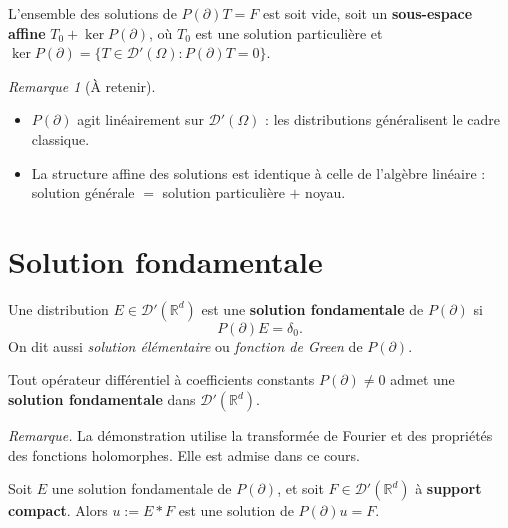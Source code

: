 \documentclass[12pt,a4paper,openany]{book}
\theoremstyle{definition}
\theoremstyle{plain}
\theoremstyle{remark}
\newtheorem*{remark}{Remarque}
\begin{document}
	\begin{proposition}
		L'ensemble des solutions de $P(\partial)T = F$ est soit vide, soit un
		\textbf{sous-espace affine} $T_0 + \ker P(\partial)$, où $T_0$ est une solution
		particulière et $\ker P(\partial) = \{T \in \mathcal{D}'(\Omega) : P(\partial)T = 0\}$.
	\end{proposition}
	
	\begin{remark}[À retenir]
		\begin{itemize}[itemsep=4pt]
			\item $P(\partial)$ agit linéairement sur $\mathcal{D}'(\Omega)$ : les distributions
			généralisent le cadre classique.
			\item La structure affine des solutions est identique à celle de l'algèbre linéaire :
			solution générale $=$ solution particulière $+$ noyau.
		\end{itemize}
	\end{remark}
	
	\section{Solution fondamentale}
	
	\begin{definition}
		Une distribution $E \in \mathcal{D}'(\mathbb{R}^d)$ est une \textbf{solution fondamentale}
		de $P(\partial)$ si
		\[
		P(\partial)E = \delta_0.
		\]
		On dit aussi \emph{solution élémentaire} ou \emph{fonction de Green} de $P(\partial)$.
	\end{definition}
	
	\begin{theorem}
		Tout opérateur différentiel à coefficients constants $P(\partial) \neq 0$ admet une
		\textbf{solution fondamentale} dans $\mathcal{D}'(\mathbb{R}^d)$.
	\end{theorem}
	
	\textit{Remarque.} La démonstration utilise la transformée de Fourier et des propriétés
	des fonctions holomorphes. Elle est admise dans ce cours.
	
	\begin{theorem}
		Soit $E$ une solution fondamentale de $P(\partial)$, et soit
		$F \in \mathcal{D}'(\mathbb{R}^d)$ à \textbf{support compact}. Alors $u := E * F$ est une
		solution de $P(\partial)u = F$.
	\end{theorem}
	
\end{document}
